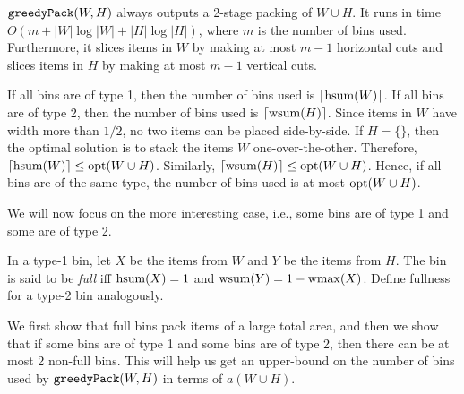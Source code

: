 \begin{claim}
\label{thm:greedy-pack}
$\operatorname{\mathtt{greedyPack}}(W, H)$ always outputs a 2-stage packing of $W \cup H$.
It runs in time $O(m + |W|\log|W| + |H|\log|H|)$,
where $m$ is the number of bins used.
Furthermore, it slices items in $W$ by making at most $m-1$ horizontal cuts
and slices items in $H$ by making at most $m-1$ vertical cuts.
\end{claim}

If all bins are of type 1, then the number of bins used is $\lceil \operatorname{hsum}(W) \rceil$.
If all bins are of type 2, then the number of bins used is $\lceil \operatorname{wsum}(H) \rceil$.
Since items in $W$ have width more than $1/2$, no two items can be placed side-by-side.
If $H = \{\}$, then the optimal solution is to stack the items $W$ one-over-the-other.
Therefore, $\lceil \operatorname{hsum}(W) \rceil \le \operatorname{opt}(W \cup H)$.
Similarly, $\lceil \operatorname{wsum}(H) \rceil \le \operatorname{opt}(W \cup H)$.
Hence, if all bins are of the same type, the number of bins used is at most $\operatorname{opt}(W \cup H)$.

We will now focus on the more interesting case, i.e.,
some bins are of type 1 and some are of type 2.

\begin{definition}
In a type-1 bin, let $X$ be the items from $W$ and $Y$ be the items from $H$.
The bin is said to be \emph{full} iff $\operatorname{hsum}(X) = 1$ and $\operatorname{wsum}(Y) = 1 - \operatorname{wmax}(X)$.
Define fullness for a type-2 bin analogously.
\end{definition}

We first show that full bins pack items of a large total area,
and then we show that if some bins are of type 1 and some bins are of type 2,
then there can be at most 2 non-full bins.
This will help us get an upper-bound on the number of bins used by $\operatorname{\mathtt{greedyPack}}(W, H)$
in terms of $a(W \cup H)$.

